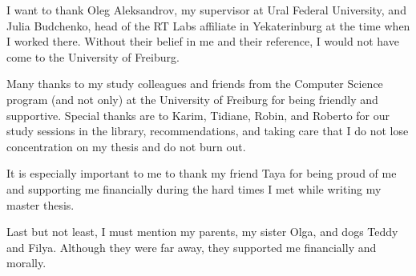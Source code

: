 I want to thank Oleg Aleksandrov, my supervisor at Ural Federal University, and Julia Budchenko, head of the RT Labs affiliate in Yekaterinburg at the time when I worked there. Without their belief in me and their reference, I would not have come to the University of Freiburg.

Many thanks to my study colleagues and friends from the Computer Science program (and not only) at the University of Freiburg for being friendly and supportive. Special thanks are to Karim, Tidiane, Robin, and Roberto for our study sessions in the library, recommendations, and taking care that I do not lose concentration on my thesis and do not burn out.

It is especially important to me to thank my friend Taya for being proud of me and supporting me financially during the hard times I met while writing my master thesis.

Last but not least, I must mention my parents, my sister Olga, and dogs Teddy and Filya. Although they were far away, they supported me financially and morally.